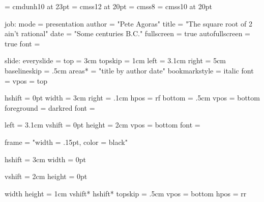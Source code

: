 %
% 
%





\font\maintitlefont  = cmdunh10 at 23pt
\font\slidetitlefont = cmss12   at 20pt
\font\subtitlefont   = cmss8
\font\titlefont      = cmss10   at 20pt

\setparameter job:
  mode           = presentation
  author         = "Pete Agoras"
  title          = "The square root of 2 ain't rational"
  date           = "Some centuries B.C\rlap." %
  fullscreen     = true
  autofullscreen = true
  font           = \tenrm


%
%
\setparameter slide:
  everyslide    = \everyslide
  top           = 3cm
  topskip       = 1cm
  left          = 3.1cm
  right         = 5cm
  baselineskip  = .5cm
  areas*        = "title by author date"
  bookmarkstyle = italic
  font          = \tenrm
  vpos          = top

\def\everyslide{%
  \position{top}\slidetitle
  \position{left}{\Author\par\Date}
  \position{menu}{\quitvmode\showbookmarks\Bookmarks}
  \position{menu}[0pt,0pt]{\the\numexpr\slidenumber-1\relax}
  }

%
% 
  hshift     = 0pt
  width      = 3cm
  right      = .1cm
  hpos       = rf
  bottom     = .5cm
  vpos       = bottom
  foreground = darkred
  font       = \subtitlefont

  left   = 3.1cm
  vshift = 0pt
  height = 2cm
  vpos   = bottom
  font   = \titlefont

  frame  = "width = .15pt, color = black"

  hshift = 3cm
  width  = 0pt

  vshift = 2cm
  height = 0pt

%
%
  width height = 1cm
  vshift* hshift* topskip = .5cm 
  vpos = bottom
  hpos = rr

